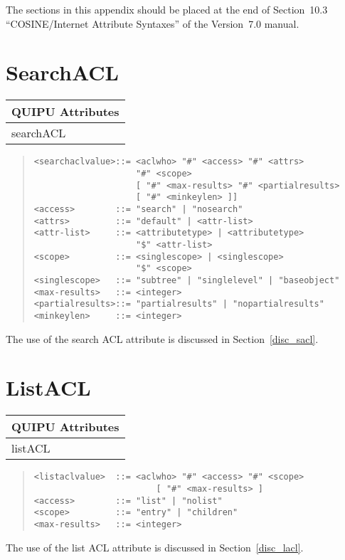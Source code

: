 The sections in this appendix should be placed at the end of Section~10.3
``COSINE/Internet Attribute Syntaxes'' of the Version~7.0 manual.

\section{SearchACL}

\label{searchacl}
\begin{center}\small
\begin{tabular}{|l|}\hline
QUIPU Attributes \\ \hline
	searchACL\\
\hline
\end{tabular}
\end{center}
\begin{quote}\begin{verbatim}
<searchaclvalue>::= <aclwho> "#" <access> "#" <attrs> 
                    "#" <scope>
                    [ "#" <max-results> "#" <partialresults>
                    [ "#" <minkeylen> ]]
<access>        ::= "search" | "nosearch"
<attrs>         ::= "default" | <attr-list>
<attr-list>     ::= <attributetype> | <attributetype> 
                    "$" <attr-list>
<scope>         ::= <singlescope> | <singlescope> 
                    "$" <scope>
<singlescope>   ::= "subtree" | "singlelevel" | "baseobject"
<max-results>   ::= <integer>
<partialresults>::= "partialresults" | "nopartialresults"
<minkeylen>     ::= <integer>
\end{verbatim}\end{quote}
The use of the search ACL attribute is discussed in Section~\ref{disc_sacl}.

\section{ListACL}
\label{listacl}
\begin{center}\small
\begin{tabular}{|l|}\hline
QUIPU Attributes \\ \hline
	listACL\\
\hline
\end{tabular}
\end{center}
\begin{quote}\begin{verbatim}
<listaclvalue>  ::= <aclwho> "#" <access> "#" <scope>
                        [ "#" <max-results> ]
<access>        ::= "list" | "nolist"
<scope>         ::= "entry" | "children"
<max-results>   ::= <integer>
\end{verbatim}\end{quote}
The use of the list ACL attribute is discussed in Section~\ref{disc_lacl}.

